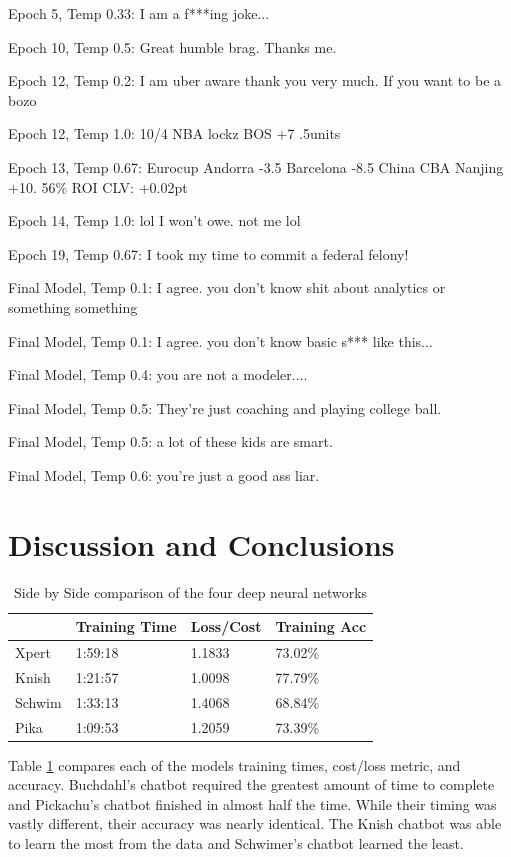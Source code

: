 \documentclass[5p,authoryear]{elsarticle}
\begin{document}
Epoch 5, Temp 0.33:
I am a f***ing joke... 

Epoch 10, Temp 0.5:
Great humble brag. Thanks me. 

Epoch 12, Temp 0.2:
I am uber aware thank you very much. If you want to be a bozo 

Epoch 12, Temp 1.0:
10/4 NBA lockz BOS +7 .5units

Epoch 13, Temp 0.67:
Eurocup Andorra -3.5 Barcelona -8.5 China CBA Nanjing +10. 56\% ROI CLV: +0.02pt 

Epoch 14, Temp 1.0:
lol I won't owe. not me lol 

Epoch 19, Temp 0.67:
I took my time to commit a federal felony! 

Final Model, Temp 0.1:
I agree. you don’t know shit about analytics or something something 

Final Model, Temp 0.1:
I agree. you don’t know basic s*** like this... 

Final Model, Temp 0.4:
you are not a modeler....

Final Model, Temp 0.5:
They’re just coaching and playing college ball. 

Final Model, Temp 0.5:
a lot of these kids are smart. 

Final Model, Temp 0.6:
you're just a good ass liar. 




\section{Discussion and Conclusions}


\begin{table}[!htb] 
  \centering 
  \begin{tabular}{@{\small}llll@{}} 
    \toprule %
    & {\footnotesize Training Time} &  {\footnotesize Loss/Cost} & {\footnotesize Training Acc} \\ \midrule
    Xpert & 1:59:18 & 1.1833 & 73.02\% \\
    Knish & 1:21:57 & 1.0098 & 77.79\% \\
    Schwim & 1:33:13 & 1.4068 & 68.84\% \\
    Pika & 1:09:53 & 1.2059 & 73.39\% \\ 
    \bottomrule
\end{tabular} \caption{Side by Side comparison of the four deep neural networks} \label{table_eval}
\end{table}


Table \ref{table_eval} compares each of the models training times, cost/loss metric, and accuracy. Buchdahl’s chatbot required the greatest amount of time to complete and Pickachu’s chatbot finished in almost half the time. While their timing was vastly different, their accuracy was nearly identical. The Knish chatbot was able to learn the most from the data and Schwimer’s chatbot learned the least.
\end{document}
